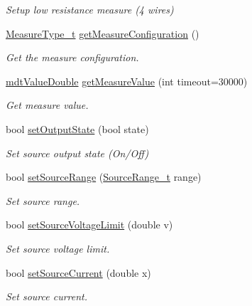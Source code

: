 \begin{DoxyCompactItemize}
\begin{DoxyCompactList}\small\item\em Setup low resistance measure (4 wires) \end{DoxyCompactList}\item 
\hyperlink{classmdt_device_u3606_a_a75dc9c6f4c68da0106a6be067fd658b7}{Measure\-Type\-\_\-t} \hyperlink{classmdt_device_u3606_a_ad1261494c005f000b982999f2a5965aa}{get\-Measure\-Configuration} ()
\begin{DoxyCompactList}\small\item\em Get the measure configuration. \end{DoxyCompactList}\item 
\hyperlink{classmdt_value_double}{mdt\-Value\-Double} \hyperlink{classmdt_device_u3606_a_adbe3f51a256da8b9773928c2c7aefe46}{get\-Measure\-Value} (int timeout=30000)
\begin{DoxyCompactList}\small\item\em Get measure value. \end{DoxyCompactList}\item 
bool \hyperlink{classmdt_device_u3606_a_abdecce2f61926be3acffbd96aa83c497}{set\-Output\-State} (bool state)
\begin{DoxyCompactList}\small\item\em Set source output state (On/\-Off) \end{DoxyCompactList}\item 
bool \hyperlink{classmdt_device_u3606_a_a21585d288820cd0e87d17ee7621bd034}{set\-Source\-Range} (\hyperlink{classmdt_device_u3606_a_a8fc404c35beec2cdb8c26f8709394a50}{Source\-Range\-\_\-t} range)
\begin{DoxyCompactList}\small\item\em Set source range. \end{DoxyCompactList}\item 
bool \hyperlink{classmdt_device_u3606_a_a333740f79b57dd1d9135d0fa590d2680}{set\-Source\-Voltage\-Limit} (double v)
\begin{DoxyCompactList}\small\item\em Set source voltage limit. \end{DoxyCompactList}\item 
bool \hyperlink{classmdt_device_u3606_a_acee48f6f2fff3ba8b727b790b1ab65bf}{set\-Source\-Current} (double x)
\begin{DoxyCompactList}\small\item\em Set source current. \end{DoxyCompactList}\end{DoxyCompactItemize}
